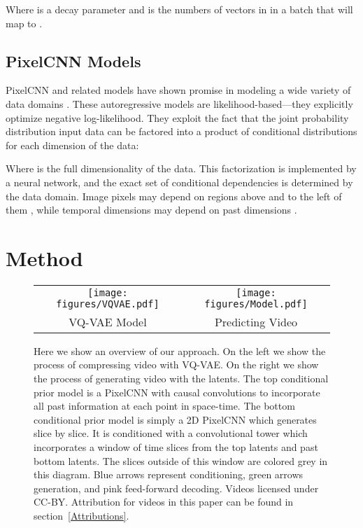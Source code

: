 \documentclass{article}
\begin{document}
Where  is a decay parameter and  is the numbers of vectors in  in a batch that will map to .


\subsection{PixelCNN Models}

PixelCNN and related models have shown promise in modeling a wide variety of data domains \cite{OordKK16, oord2016wavenet, KalchbrennerOSD17, WeissenbornTU20}. These autoregressive models are likelihood-based---they explicitly optimize negative log-likelihood. They exploit the fact that the joint probability distribution input data  can be factored into a product of conditional distributions for each dimension of the data:



Where  is the full dimensionality of the data. This factorization is implemented by a neural network, and the exact set of conditional dependencies is determined by the data domain. Image pixels may depend on regions above and to the left of them \cite{OordKK16}, while temporal dimensions may depend on past dimensions \cite{oord2016wavenet, KalchbrennerOSD17, WeissenbornTU20}.
 \section{Method}

\begin{figure}
\begin{tabular}{c||c}
  \texttt{[image: figures/VQVAE.pdf]} &
  \texttt{[image: figures/Model.pdf]} \\
  VQ-VAE Model & Predicting Video
  \end{tabular}
  \caption{Here we show an overview of our approach. On the left we show the process of compressing video with VQ-VAE. On the right we show the process of generating video with the latents. The top conditional prior model is a PixelCNN with causal convolutions to incorporate all past information at each point in space-time. The bottom conditional prior model is simply a 2D PixelCNN which generates slice by slice. It is conditioned with a convolutional tower which incorporates a window of time slices from the top latents and past bottom latents. The slices outside of this window are colored grey in this diagram. Blue arrows represent conditioning, green arrows generation, and pink feed-forward decoding. Videos licensed under CC-BY. Attribution for videos in this paper can be found in section~\ref{Attributions}.}
\label{VQVAE}
\end{figure}
\end{document}
